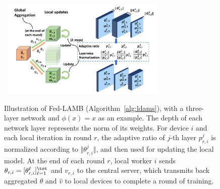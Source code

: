 \documentclass[11pt]{article}
\begin{document}
\begin{figure}[H]
\centering
\mbox{\hspace{-0.15in}
        \includegraphics[width=0.7\textwidth]{plot/plot1.pdf}
}
	\caption{Illustration of Fed-LAMB (Algorithm~\ref{alg:ldams}), with a three-layer network and $\phi(x)=x$ as an example. The depth of each network layer represents the norm of its weights. For device $i$ and each local iteration in round $r$, the adaptive ratio of $j$-th layer $p_{r,i}^j$ is normalized according to $\Vert \theta_{r,i}^j\Vert$, and then used for updating the local model. At the end of each round $r$, local worker $i$ sends $\theta_{r,i} =  [\theta_{r,i}^{\ell}]_{\ell =1}^{\tot}$ and $v_{r,i}$ to the central server, which transmits back aggregated $\theta$ and $\hat v$ to local devices to complete a round of training.}
	\label{fig:illustrate}\vspace{-0.1in}
\end{figure}
\end{document}

